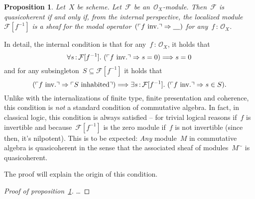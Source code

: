 \documentclass[10pt]{amsart}
\theoremstyle{definition}
\theoremstyle{plain}
\newtheorem{prop}[defn]{Proposition}
\theoremstyle{remark}
\newcommand{\F}{\mathcal{F}}
\renewcommand{\O}{\mathcal{O}}
\newcommand{\placeholder}{\underline{\quad}}
\newcommand{\?}{\,{:}\,}
\renewcommand{\_}{\mathpunct{.}\,}
\newcommand{\speak}[1]{\ulcorner\text{\textnormal{#1}}\urcorner}
\begin{document}
\begin{prop}\label{qcoh:sheafchar}
Let~$X$ be scheme. Let~$\F$ be an~$\O_X$-module. Then~$\F$ is
quasicoherent if and only if, from the internal perspective, the localized
module~$\F[f^{-1}]$ is a sheaf for the modal operator~$(\speak{$f$ inv.}
\Rightarrow \placeholder)$ for any~$f\?\O_X$.
\end{prop}

In detail, the internal condition is that for any~$f\?\O_X$, it holds that
\[ \forall s\?\F[f^{-1}]\_
  (\speak{$f$ inv.} \Rightarrow s = 0) \Longrightarrow s = 0 \]
and for any subsingleton~$S \subseteq \F[f^{-1}]$ it holds that
\[ (\speak{$f$ inv.} \Rightarrow \speak{$S$ inhabited}) \Longrightarrow
  \exists s\?\F[f^{-1}]\_
  (\speak{$f$ inv.} \Rightarrow s \in S). \]
Unlike with the internalizations of finite type, finite presentation and
coherence, this condition is \emph{not} a standard condition of commutative
algebra. In fact, in classical logic, this condition is always satisfied --
for trivial logical reasons if~$f$ is invertible and because~$\F[f^{-1}]$ is
the zero module if~$f$ is not invertible (since then, it's nilpotent). This is
to be expected: \emph{Any} module~$M$ in commutative algebra is quasicoherent in
the sense that the associated sheaf of modules~$M^\sim$ is quasicoherent.

The proof will explain the origin of this condition.

\begin{proof}[Proof of proposition~\ref{qcoh:sheafchar}]\ldots\end{proof}
\end{document}
